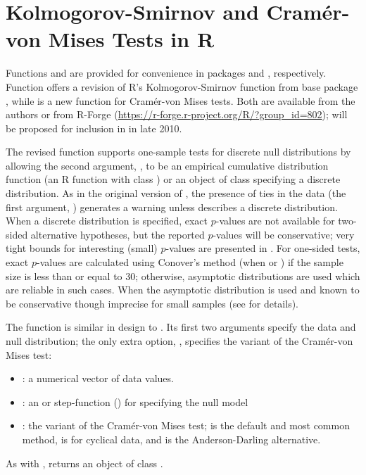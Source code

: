 \section{Kolmogorov-Smirnov and Cram\'{e}r-von Mises Tests in R}

Functions  and  are provided for
convenience in packages  and , respectively.
Function  offers a revision of
R's Kolmogorov-Smirnov function  from base
package , while  is a new
function for Cram\'{e}r-von Mises tests.
Both are available from the authors
or from R-Forge (\url{https://r-forge.r-project.org/R/?group_id=802});
 will be proposed for inclusion in  in late 2010.

The revised  function supports one-sample tests for discrete
null distributions by allowing the second argument, , to be
an empirical cumulative distribution function (an R function
with class ) or an object of class  specifying
a discrete distribution.  As in the original version of ,
the presence of ties in the data (the first argument, ) generates a
warning unless  describes a discrete distribution.  When a discrete
distribution is specified, exact $p$-values are not available for 
two-sided alternative hypotheses, but the reported $p$-values will be
conservative; very tight bounds for interesting (small) $p$-values are
presented in \cite{Conover1972}.  For one-sided tests,
exact $p$-values are calculated using Conover's
method (when  or )
if the sample size is less than or equal to 30; otherwise, asymptotic distributions
are used which are reliable in such cases.
When  the asymptotic distribution is used and known
to be conservative though imprecise for small samples (see \cite{Conover1972}
for details).


The function  is similar in design
to .  Its first two
arguments specify the data and null distribution; the only extra option,
, specifies the variant of the Cram\'{e}r-von Mises test:
\begin{itemize}
\item {}: a numerical vector of data values.
\item {}: an  or step-function () for specifying
the null model
\item {}: the variant of the Cram\'{e}r-von Mises test; 
is the default and most common method,  is for cyclical data,
and  is the Anderson-Darling alternative.
\end{itemize}
As with ,  returns an object of class 
.


